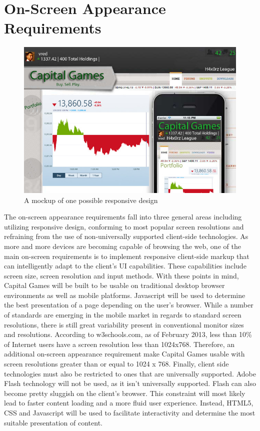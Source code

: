\section{On-Screen Appearance Requirements}
{
\begin{figure}
\centering
\includegraphics[width=5.5in]{./img/responsiveenough.jpg}
\caption{A mockup of one possible responsive design}
\end{figure}
}
The on-screen appearance requirements fall into three general areas including utilizing responsive design, conforming to most popular screen resolutions and refraining from the use of non-universally supported client-side technologies. As more and more devices are becoming capable of browsing the web, one of the main on-screen requirements is to implement responsive client-side markup that can intelligently adapt to the client’s UI capabilities. These capabilities include screen size, screen resolution and input methods. With these points in mind, Capital Games will be built to be usable on traditional desktop browser environments as well as mobile platforms. Javascript will be used to determine the best presentation of a page depending on the user’s browser. While a number of standards are emerging in the mobile market in regards to standard screen resolutions, there is still great variability present in conventional monitor sizes and resolutions. According to w3schools.com, as of February 2013, less than 10\% of Internet users have a screen resolution less than 1024x768. Therefore, an additional on-screen appearance requirement make Capital Games usable with screen resolutions greater than or equal to 1024 x 768. Finally, client side technologies must also be restricted to ones that are universally supported. Adobe Flash technology will not be used, as it isn’t universally supported. Flash can also become pretty sluggish on the client’s browser. This constraint will most likely lead to faster content loading and a more fluid user experience. Instead, HTML5, CSS and Javascript will be used to facilitate interactivity and determine the most suitable presentation of content.